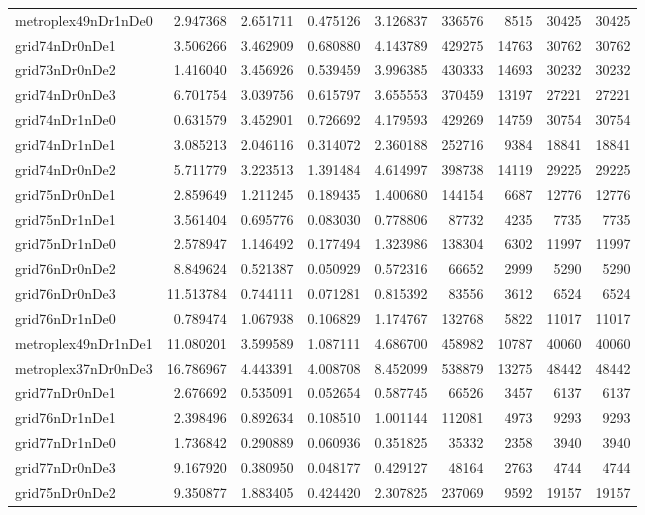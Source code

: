 \documentclass[../../../thesis.tex]{subfiles}
\begin{document}
\begin{longtable}{|l|r|r|r|r|r|r|r|r|}
metroplex49nDr1nDe0 & 2.947368 & 2.651711 & 0.475126 & 3.126837 & 336576 & 8515 & 30425 & 30425 \\
grid74nDr0nDe1 & 3.506266 & 3.462909 & 0.680880 & 4.143789 & 429275 & 14763 & 30762 & 30762 \\
grid73nDr0nDe2 & 1.416040 & 3.456926 & 0.539459 & 3.996385 & 430333 & 14693 & 30232 & 30232 \\
grid74nDr0nDe3 & 6.701754 & 3.039756 & 0.615797 & 3.655553 & 370459 & 13197 & 27221 & 27221 \\
grid74nDr1nDe0 & 0.631579 & 3.452901 & 0.726692 & 4.179593 & 429269 & 14759 & 30754 & 30754 \\
grid74nDr1nDe1 & 3.085213 & 2.046116 & 0.314072 & 2.360188 & 252716 & 9384 & 18841 & 18841 \\
grid74nDr0nDe2 & 5.711779 & 3.223513 & 1.391484 & 4.614997 & 398738 & 14119 & 29225 & 29225 \\
grid75nDr0nDe1 & 2.859649 & 1.211245 & 0.189435 & 1.400680 & 144154 & 6687 & 12776 & 12776 \\
grid75nDr1nDe1 & 3.561404 & 0.695776 & 0.083030 & 0.778806 & 87732 & 4235 & 7735 & 7735 \\
grid75nDr1nDe0 & 2.578947 & 1.146492 & 0.177494 & 1.323986 & 138304 & 6302 & 11997 & 11997 \\
grid76nDr0nDe2 & 8.849624 & 0.521387 & 0.050929 & 0.572316 & 66652 & 2999 & 5290 & 5290 \\
grid76nDr0nDe3 & 11.513784 & 0.744111 & 0.071281 & 0.815392 & 83556 & 3612 & 6524 & 6524 \\
grid76nDr1nDe0 & 0.789474 & 1.067938 & 0.106829 & 1.174767 & 132768 & 5822 & 11017 & 11017 \\
metroplex49nDr1nDe1 & 11.080201 & 3.599589 & 1.087111 & 4.686700 & 458982 & 10787 & 40060 & 40060 \\
metroplex37nDr0nDe3 & 16.786967 & 4.443391 & 4.008708 & 8.452099 & 538879 & 13275 & 48442 & 48442 \\
grid77nDr0nDe1 & 2.676692 & 0.535091 & 0.052654 & 0.587745 & 66526 & 3457 & 6137 & 6137 \\
grid76nDr1nDe1 & 2.398496 & 0.892634 & 0.108510 & 1.001144 & 112081 & 4973 & 9293 & 9293 \\
grid77nDr1nDe0 & 1.736842 & 0.290889 & 0.060936 & 0.351825 & 35332 & 2358 & 3940 & 3940 \\
grid77nDr0nDe3 & 9.167920 & 0.380950 & 0.048177 & 0.429127 & 48164 & 2763 & 4744 & 4744 \\
grid75nDr0nDe2 & 9.350877 & 1.883405 & 0.424420 & 2.307825 & 237069 & 9592 & 19157 & 19157 \\

\end{longtable}
\end{document}
